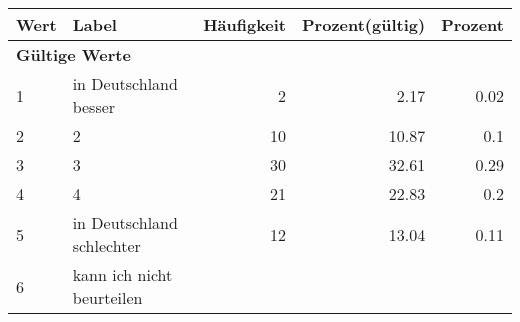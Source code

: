      \begin{longtable}{lXrrr}
     \toprule
     \textbf{Wert} & \textbf{Label} & \textbf{Häufigkeit} & \textbf{Prozent(gültig)} & \textbf{Prozent} \\
     \endhead
     \midrule
     \multicolumn{5}{l}{\textbf{Gültige Werte}}\\

     1 &
     \multicolumn{1}{X}{ in Deutschland besser   } &


       \num{2} &
       \num[round-mode=places,round-precision=2]{2.17} &
         \num[round-mode=places,round-precision=2]{0.02} \\

     2 &
     \multicolumn{1}{X}{ 2   } &


       \num{10} &
       \num[round-mode=places,round-precision=2]{10.87} &
         \num[round-mode=places,round-precision=2]{0.1} \\

     3 &
     \multicolumn{1}{X}{ 3   } &


       \num{30} &
       \num[round-mode=places,round-precision=2]{32.61} &
         \num[round-mode=places,round-precision=2]{0.29} \\

     4 &
     \multicolumn{1}{X}{ 4   } &


       \num{21} &
       \num[round-mode=places,round-precision=2]{22.83} &
         \num[round-mode=places,round-precision=2]{0.2} \\

     5 &
     \multicolumn{1}{X}{ in Deutschland schlechter   } &


       \num{12} &
       \num[round-mode=places,round-precision=2]{13.04} &
         \num[round-mode=places,round-precision=2]{0.11} \\

     6 &
     \multicolumn{1}{X}{ kann ich nicht beurteilen   } &



\end{longtable}
